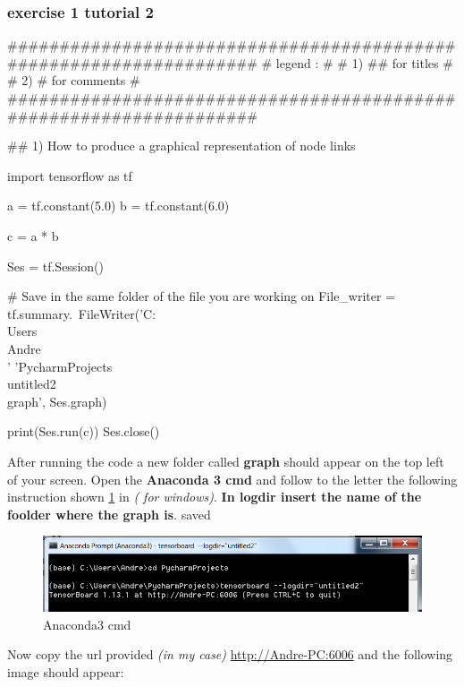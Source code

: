 \documentclass[11pt]{article}
\begin{document}
\subsubsection{exercise 1  tutorial 2}
\begin{python}
###################################################################
# legend :                                                        #
#         1) ## for titles                                        #
#         2) #  for comments                                      #
###################################################################

## 1) How to produce a graphical representation of node links

import tensorflow as tf

a = tf.constant(5.0)
b = tf.constant(6.0)

c = a * b

Ses = tf.Session()

# Save in the same folder of the file you are working on
File_writer = tf.summary.\
    FileWriter('C:\\Users\\Andre\\'
               'PycharmProjects\\untitled2\\graph', Ses.graph)

print(Ses.run(c))
Ses.close()
\end{python}{}

After running the code a new folder called \textbf{graph }should appear on the top left of your screen.
Open the \textbf{Anaconda 3 cmd} and follow to the letter the following instruction shown \ref{fig:Anaconda3cmd} in \textit{( for windows)}.
\textbf{In logdir insert the name of the foolder where the graph is}. saved
\begin{figure}[h]
\centering
\captionsetup{justification=centering}
\includegraphics[width=1\linewidth]{graphical_rapr.pdf}
\caption{Anaconda3 cmd }
\label{fig:Anaconda3cmd}
\end{figure}
\clearpage
Now copy the url provided \textit{(in my case) }\url{http://Andre-PC:6006} and the following image should appear:
\end{document}
